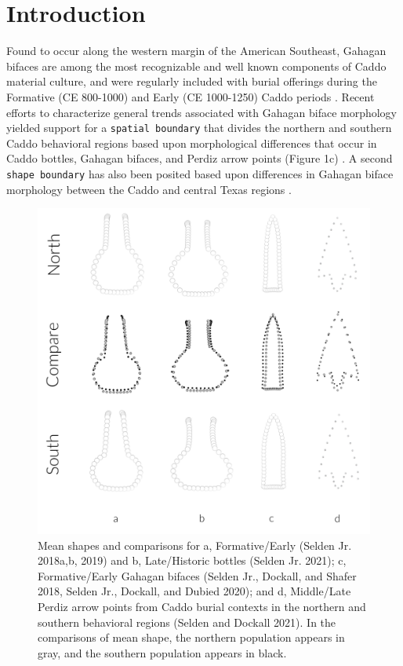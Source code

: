 \documentclass[]{interact}
\theoremstyle{plain}%
\theoremstyle{definition}
\theoremstyle{remark}
\begin{document}
\hypertarget{introduction}{%
\section{Introduction}\label{introduction}}

Found to occur along the western margin of the American Southeast,
Gahagan bifaces are among the most recognizable and well known
components of Caddo material culture, and were regularly included with
burial offerings during the Formative (CE 800-1000) and Early (CE
1000-1250) Caddo periods
\citep{RN7115,RN8189,RN5746,RN8186,RN8174,RN8176}. Recent efforts to
characterize general trends associated with Gahagan biface morphology
yielded support for a \texttt{spatial\ boundary} that divides the
northern and southern Caddo behavioral regions based upon morphological
differences that occur in Caddo bottles, Gahagan bifaces, and Perdiz
arrow points (Figure 1c)
\citep{RN7925,RN8071,RN8361,RN8967,RN11064,RN8154}. A second
\texttt{shape\ boundary} has also been posited based upon differences in
Gahagan biface morphology between the Caddo and central Texas regions
\citep{RN8318}.

\begin{figure}

{\centering \includegraphics[width=0.8\linewidth]{img/fig01} 

}

\caption{Mean shapes and comparisons for a, Formative/Early (Selden Jr. 2018a,b, 2019) and b, Late/Historic bottles (Selden Jr. 2021); c, Formative/Early Gahagan bifaces (Selden Jr., Dockall, and Shafer 2018, Selden Jr., Dockall, and Dubied 2020); and d, Middle/Late Perdiz arrow points from Caddo burial contexts in the northern and southern behavioral regions (Selden and Dockall 2021). In the comparisons of mean shape, the northern population appears in gray, and the southern population appears in black.}\label{fig:fig01}
\end{figure}
\end{document}
